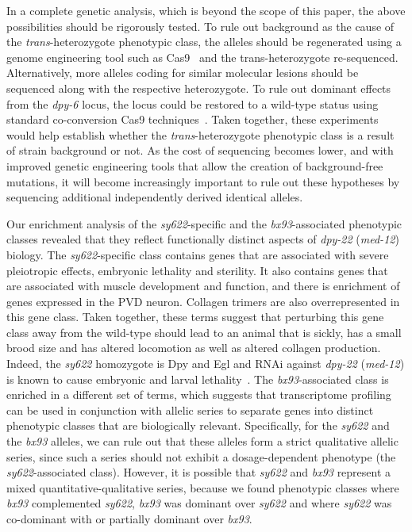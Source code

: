 \documentclass[10pt, onecolumn]{article}
\newcommand{\gene}[1]{\mbox{\emph{#1}}}
\newcommand{\dpy}{\gene{dpy-22} (\emph{med-12})}
\begin{document}
In a complete genetic analysis, which is beyond the scope of this paper, the
above possibilities should be rigorously tested. To rule out background as the
cause of the \emph{trans}-heterozygote phenotypic class, the alleles should be
regenerated using a genome engineering tool such as Cas9~\cite{} and the
trans-heterozygote re-sequenced. Alternatively, more alleles coding for similar
molecular lesions should be sequenced along with the respective heterozygote. To
rule out dominant effects from the \emph{dpy-6} locus, the locus could be
restored to a wild-type status using standard co-conversion Cas9
techniques~\cite{}. Taken together, these experiments would help establish
whether the \emph{trans}-heterozygote phenotypic class is a result of strain
background or not.  As the cost of sequencing becomes lower, and with improved
genetic engineering tools that allow the creation of background-free mutations,
it will become increasingly important to rule out these hypotheses by sequencing
additional independently derived identical alleles.


Our enrichment analysis of the \emph{sy622}-specific and the
\emph{bx93}-associated phenotypic classes revealed that they reflect
functionally distinct aspects of \dpy{} biology. The \emph{sy622}-specific class
contains genes that are associated with severe pleiotropic effects, embryonic
lethality and sterility. It also contains genes that are associated with muscle
development and function, and there is enrichment of genes expressed in the PVD
neuron. Collagen trimers are also overrepresented in this gene class.
Taken together, these terms suggest that perturbing this gene class away from
the wild-type should lead to an animal that is sickly, has a small brood size
and has altered locomotion as well as altered collagen production. Indeed, the
\emph{sy622} homozygote is Dpy and Egl and RNAi against \dpy{} is known to cause
embryonic and larval lethality~\cite{}. The \emph{bx93}-associated class is
enriched in a different set of terms, which suggests that transcriptome
profiling can be used in conjunction with allelic series to separate genes into
distinct phenotypic classes that are biologically relevant. Specifically, for
the \emph{sy622} and the \emph{bx93} alleles, we can rule out that these alleles
form a strict qualitative allelic series, since such a series should not exhibit
a dosage-dependent phenotype (the \emph{sy622}-associated class). However, it is
possible that \emph{sy622} and \emph{bx93} represent a mixed
quantitative-qualitative series, because we found phenotypic classes where
\emph{bx93} complemented \emph{sy622}, \emph{bx93} was dominant over
\emph{sy622} and where \emph{sy622} was co-dominant with or partially dominant
over \emph{bx93}.
\end{document}
